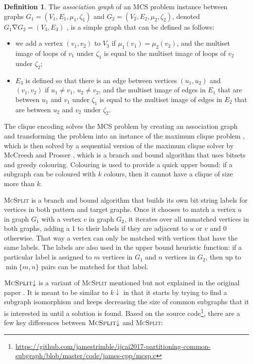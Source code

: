 \documentclass{l4proj}
\theoremstyle{definition}
\newtheorem{definition}{Definition}[chapter]
\theoremstyle{remark}
\DeclareMathOperator{\nablaop}{\nabla}
\begin{document}
\begin{definition} \label{def:nabla}
  The \emph{association graph} of an MCS problem instance between graphs $G_1 =
  (V_1, E_1, \mu_1, \zeta_1)$ and $G_2 = (V_2, E_2, \mu_2, \zeta_2)$, denoted
  $G_1 \nablaop G_2 = (V_3, E_3)$ \cite{DBLP:conf/cp/McCreeshNPS16}, is a simple
  graph that can be defined as follows:
  \begin{itemize}
  \item we add a vertex $(v_1, v_2)$ to $V_3$ if $\mu_1(v_1) = \mu_2(v_2)$, and
    the multiset image of loops of $v_1$ under $\zeta_1$ is equal to the
    multiset image of loops of $v_2$ under $\zeta_2$;
  \item $E_3$ is defined so that there is an edge between vertices $(u_1, u_2)$
    and $(v_1, v_2)$ if $u_1 \ne v_1$, $u_2 \ne v_2$, and the multiset image of
    edges in $E_1$ that are between $u_1$ and $v_1$ under $\zeta_1$ is equal to
    the multiset image of edges in $E_2$ that are between $u_2$ and $v_2$ under
    $\zeta_2$.
  \end{itemize}
\end{definition}

\noindent The clique encoding \cite{DBLP:conf/cp/McCreeshNPS16} solves the MCS
problem by creating an association graph and transforming the problem into an
instance of the maximum clique problem \cite{Levi1973}, which is then solved by
a sequential version of the maximum clique solver by McCreesh and Prosser
\cite{DBLP:journals/topc/McCreeshP15}, which is a branch and bound algorithm
that uses bitsets and greedy colouring. Colouring is used to provide a quick
upper bound: if a subgraph can be coloured with $k$ colours, then it cannot have
a clique of size more than $k$.

\textsc{McSplit} \cite{DBLP:conf/ijcai/McCreeshPT17} is a branch and bound
algorithm that builds its own bit string labels for vertices in both pattern and
target graphs. Once it chooses to match a vertex $u$ in graph $G_1$ with a
vertex $v$ in graph $G_2$, it iterates over all unmatched vertices in both
graphs, adding a 1 to their labels if they are adjacent to $u$ or $v$ and 0
otherwise. That way a vertex can only be matched with vertices that have the
same labels. The labels are also used in the upper bound heuristic function:
if a particular label is assigned to $m$ vertices in $G_1$ and $n$ vertices in
$G_2$, then up to $\min \{ m, n \}$ pairs can be matched for that label.

$\textsc{McSplit} {\downarrow}$ is a variant of \textsc{McSplit} mentioned but not
explained in the original paper \cite{DBLP:conf/ijcai/McCreeshPT17}. It is meant
to be similar to $k{\downarrow}$ in that it starts by trying to find a subgraph
isomorphism and keeps decreasing the size of common subgraphs that it is
interested in until a solution is found. Based on the source
code\footnote{\url{https://github.com/jamestrimble/ijcai2017-partitioning-common-subgraph/blob/master/code/james-cpp/mcsp.c}},
there are a few key differences between $\textsc{McSplit} {\downarrow}$ and
\textsc{McSplit}:
\end{document}
